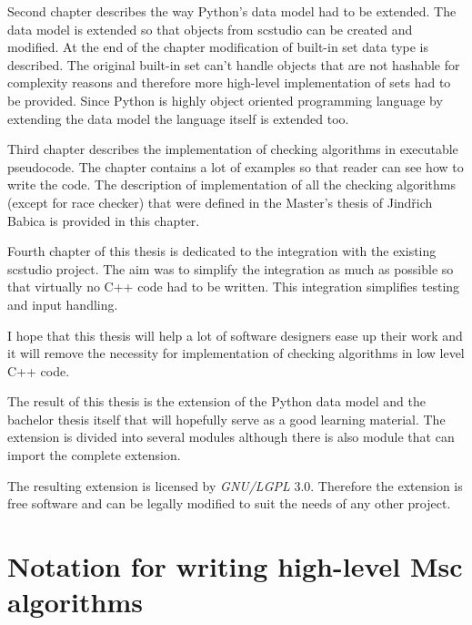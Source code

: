 \documentclass[11pt,oneside]{fithesis2}
\begin{document}
Second chapter describes the way Python's data model had to be extended. The data model is extended so that objects from scstudio can be created and modified. At the end of the chapter modification of built-in set data type is described. The original built-in set can't handle objects that are not hashable for complexity reasons and therefore more high-level implementation of sets had to be provided. Since Python is highly object oriented programming language by extending the data model the language itself is extended too.

Third chapter describes the implementation of checking algorithms in executable pseudocode. The chapter contains a lot of examples so that reader can see how to write the code. The description of implementation of all the checking algorithms (except for race checker) that were defined in the Master's thesis of Jindřich Babica\cite{babica} is provided in this chapter.

Fourth chapter of this thesis is dedicated to the integration with the existing scstudio project. The aim was to simplify the integration as much as possible so that virtually no C++ code had to be written. This integration simplifies testing and input handling.

I hope that this thesis will help a lot of software designers ease up their work and it will remove the necessity for implementation of checking algorithms in low level C++ code.

The result of this thesis is the extension of the Python data model and the bachelor thesis itself that will hopefully serve as a good learning material. The extension is divided into several modules although there is also module that can import the complete extension.

The resulting extension is licensed by \textit{GNU/LGPL} 3.0\cite{lgpl}. Therefore the extension is free software and can be legally modified to suit the needs of any other project.

\chapter{Notation for writing high-level Msc algorithms}
\end{document}
